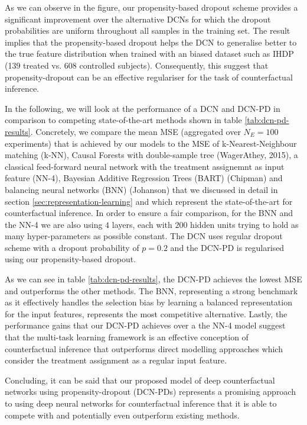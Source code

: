 As we can observe in the figure, our propensity-based dropout scheme provides a significant improvement over the alternative DCNs for which the  dropout probabilities are uniform throughout all samples in the training set. The result implies that the propensity-based dropout helps the DCN to generalise better to the true feature distribution when trained with an biased dataset such as IHDP (139 treated vs. 608 controlled subjects). Consequently, this suggest that propensity-dropout can be an effective regulariser for the task of counterfactual inference. 

In the following, we will look at the performance of a DCN and DCN-PD in comparison to competing state-of-the-art methods shown in table \ref{tab:dcn-pd-results}. Concretely, we compare the mean MSE (aggregated over $N_E = 100$ experiments) that is achieved by our models to the MSE of k-Nearest-Neighbour matching (k-NN), Causal Forests with double-sample tree (WagerAthey, 2015), %
a classical feed-forward neural network with the treatment assignemnt as input feature (NN-4),
Bayesian Additive Regression Trees (BART) (Chipman) %
and balancing neural networks (BNN) (Johanson) %
that we discussed in detail in section \ref{sec:representation-learning} and which represent the state-of-the-art for counterfactual inference. 
In order to ensure a fair comparison, for the BNN and the NN-4 we are also using $4$ layers, each with $200$ hidden units trying to hold as many hyper-parameters as possible constant. The DCN uses regular dropout scheme with a dropout probability of $p=0.2$ and the DCN-PD is regularised using our propensity-based dropout.

As we can see in table \ref{tab:dcn-pd-results}, the DCN-PD achieves the lowest MSE and outperforms the other methods. The BNN, representing  a strong benchmark as it effectively handles the selection bias by learning a balanced representation for the input features, represents the most competitive alternative. Lastly, the performance gains that our DCN-PD achieves over a the NN-4 model suggest that the multi-task learning framework is an effective conception of counterfactual inference that outperforms direct modelling approaches which consider the treatment assignment as a regular input feature.   %

Concluding, it can be said that our proposed model of deep counterfactual networks using propensity-dropout (DCN-PDs) represents a promising approach to using deep neural networks for counterfactual inference that it is able to compete with and potentially even outperform existing methods. 

